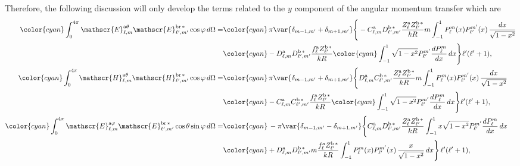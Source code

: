 Therefore, the following discussion will only develop the terms related to the $y$ component of the angular momentum transfer which are
\begin{align}
\color{cyan}\int_{0}^{4\pi} \mathscr{E}_{\ell, m}^{\text{a}\theta}\mathscr{E}_{\ell^{\prime}, m^{\prime}}^{\text{br}\,*} \cos\varphi \, d\Omega =& 
%
\color{cyan}\, \pi \var{ \delta_{m-1, m^{\prime}} + \delta_{m+1, m^{\prime}} } \Bigg\{-C_{\ell,m}^{\rm a}D_{\ell^{\prime}, m^{\prime}}^{\rm b \, *}\frac{Z_{\ell}^{\rm a}Z_{\ell^{\prime}}^{\rm b\, *}}{k R} m \int_{-1}^1 P_{\ell}^{m}(x) P_{\ell^{\prime}}^{m^{\prime}}(x) \, \frac{dx}{\sqrt{1-x^2}}\nonumber \\
%
&\color{cyan}-D_{\ell, m}^{\rm a}D_{\ell^{\prime}, m^{\prime}}^{\rm b \, *} \frac{f_{\ell}^{\rm a}Z_{\ell^{\prime}}^{\rm b \, *}}{k R} 
%
\color{cyan}\int_{-1}^1 \sqrt{1-x^2} P_{\ell^{\prime}}^{m^{\prime}} \frac{dP_{\ell}^m}{dx} \,dx \Bigg\}\ell^{\prime}(\ell^{\prime}+1),\\
%
%
\color{cyan}\int_{0}^{4\pi} \mathscr{H}_{\ell, m}^{\text{a}\theta}\mathscr{H}_{\ell^{\prime}, m^{\prime}}^{\text{br}\,*} \cos\varphi \, d\Omega =& 
%
\color{cyan}\, \pi \var{ \delta_{m-1, m^{\prime}} + \delta_{m+1, m^{\prime}} } \Bigg\{D_{\ell,m}^{\rm a}C_{\ell^{\prime}, m^{\prime}}^{\rm b \, *}\frac{Z_{\ell}^{\rm a}Z_{\ell^{\prime}}^{\rm b\, *}}{k R} m \int_{-1}^1 P_{\ell}^{m}(x) P_{\ell^{\prime}}^{m^{\prime}}(x) \, \frac{dx}{\sqrt{1-x^2}}\nonumber \\
%
&\color{cyan}-C_{\ell, m}^{\rm a}C_{\ell^{\prime}, m^{\prime}}^{\rm b \, *} \frac{f_{\ell}^{\rm a}Z_{\ell^{\prime}}^{\rm b \, *}}{k R} 
%
\color{cyan}\int_{-1}^1 \sqrt{1-x^2} P_{\ell^{\prime}}^{m^{\prime}} \frac{dP_{\ell}^m}{dx} \,dx \Bigg\}\ell^{\prime}(\ell^{\prime}+1),\\
%
%
%
%
\color{cyan}\int_0^{4\pi}\mathscr{E}_{\ell, m}^{\text{a}\varphi}\mathscr{E}_{\ell^{\prime}, m^{\prime}}^{\text{br}\,*}\cos\theta\sin\varphi \, d\Omega
%
 =&\color{cyan} \, - \pi \var{ \delta_{m-1, m^{\prime}} - \delta_{m+1, m^{\prime}} } \Bigg\{ C_{\ell, m}^{\rm a} D_{\ell^{\prime}, m^{\prime}}^{\rm b \, *} \frac{Z_{\ell}^{\rm a} Z_{\ell^{\prime}}^{\rm b \, *}}{k R} \int_{-1}^1 x \sqrt{1-x^2} P_{\ell^{\prime}}^{m^{\prime}} \frac{dP_{\ell}^m}{dx} \,dx \nonumber \\ &
%
 \color{cyan}+ D_{\ell, m}^{\rm a} D_{\ell^{\prime}, m^{\prime}}^{\rm b \, *} m \frac{f_{\ell}^{\rm a} Z_{\ell^{\prime}}^{\rm b\, *}}{k R} \int_{-1}^1 P_{\ell}^{m}(x) P_{\ell^{\prime}}^{m^{\prime}}(x) \, \frac{x}{\sqrt{1-x^2}} \, dx \Bigg\} \, \ell^{\prime}(\ell^{\prime}+1), \\ 

\end{align}
